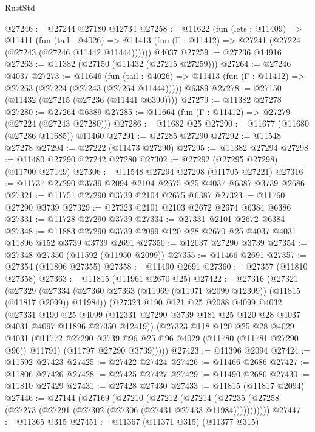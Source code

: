 \begin{lexlean}{RustStd}
\begin{coremodule}
@27246 := @27244 @27180 @12734
@27258 := @11622
    (fun (lets : @11409) =>
    @11411
      (fun (tail : @4026) =>
      @11413 (fun (Γ : @11412) => @27241 (@27224 (@27243 (@27246 @11442 @11444))))))
    @4037
@27259 := @27236 @14916
@27263 := @11382 (@27150 (@11432 (@27215 @27259)))
@27264 := @27246 @4037
@27273 := @11646
    (fun (tail : @4026) => @11413 (fun (Γ : @11412) => @27263 (@27224 (@27243 (@27264 @11444)))))
    @6389
@27278 := @27150 (@11432 (@27215 (@27236 (@11441 @6390))))
@27279 := @11382 @27278
@27280 := @27264 @6389
@27285 := @11664 (fun (Γ : @11412) => @27279 (@27224 (@27243 @27280)))
@27286 := @11682 @25
@27290 := @11677 (@11680 (@27286 @11685)) @11460
@27291 := @27285 @27290
@27292 := @11548 @27278
@27294 := @27222 (@11473 @27290)
@27295 := @11382 @27294
@27298 := @11480 @27290 @27242 @27280
@27302 := @27292 (@27295 @27298) (@11700 @27149)
@27306 := @11548 @27294 @27298 (@11705 @27221)
@27316 := @11737 @27290 @3739 @2094 @2104 @2675 @25 @4037 @6387 @3739 @2686
@27321 := @11751 @27290 @3739 @2104 @2675 @6387
@27323 := @11760 @27290 @3739
@27329 := @27323 @2101 @2103 @2672 @2674 @6384 @6386
@27331 := @11728 @27290 @3739
@27334 := @27331 @2101 @2672 @6384
@27348 := @11883 @27290 @3739 @2099 @120 @28 @2670 @25 @4037 @4031 @11896 @152 @3739 @3739 @2691
@27350 := @12037 @27290 @3739
@27354 := @27348 @27350 (@11592 (@11950 @2099))
@27355 := @11466 @2691
@27357 := @27354 (@11806 @27355)
@27358 := @11490 @2691
@27360 := @27357 (@11810 @27358)
@27363 := @11815 (@11961 @2670 @25)
@27422 := @27316
    (@27321
      (@27329
        (@27334 (@27360 @27363 (@11969 (@11971 @2099 @12309)) (@11815 (@11817 @2099)) @11984))
        (@27323
          @190
          @121
          @25
          @2088
          @4099
          @4032
          (@27331
            @190
            @25
            @4099
            (@12331 @27290 @3739 @181 @25 @120 @28 @4037 @4031 @4097 @11896 @27350 @12419))
          (@27323
            @118
            @120
            @25
            @28
            @4029
            @4031
            (@11772 @27290 @3739 @96 @25 @96 @4029 (@11780 (@11781 @27290 @96)) @11791)
            (@11797 @27290 @3739)))))
@27423 := @11396 @2094
@27424 := @11592 @27423
@27425 := @27422 @27424
@27426 := @11466 @2686
@27427 := @11806 @27426
@27428 := @27425 @27427
@27429 := @11490 @2686
@27430 := @11810 @27429
@27431 := @27428 @27430
@27433 := @11815 (@11817 @2094)
@27446 := @27144
    (@27169
      (@27210
        (@27212
          (@27214 (@27235 (@27258 (@27273 (@27291 (@27302 (@27306 (@27431 @27433 @11984)))))))))))
@27447 := @11365 @315
@27451 := @11367 (@11371 @315) (@11377 @315)

\end{coremodule}
\end{lexlean}
